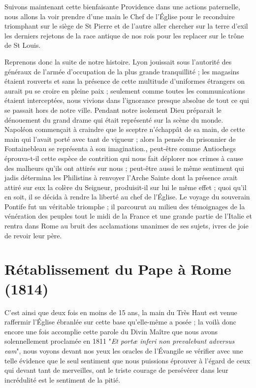 \documentclass[11pt,a4paper]{report}
\begin{document}
Suivons maintenant cette bienfaisante Providence dans une actions paternelle, nous allons la voir prendre d'une main le Chef de l'Église pour le reconduire triomphant sur le siège de St Pierre et de l'autre aller chercher sur la terre d'exil les derniers rejetons de la race antique de nos rois pour les replacer sur le trône de St Louis.

Reprenons donc la suite de notre histoire. Lyon jouissait sous l'autorité des généraux de l'armée d'occupation de la plus grande tranquillité ; les magasins étaient rouverts et sans la présence de cette multitude d'uniformes étrangers on aurait pu se croire en pleine paix ; seulement comme toutes les communications étaient interceptées, nous vivions dans l'ignorance presque absolue de tout ce qui se passait hors de notre ville. Pendant notre isolement Dieu préparait le dénouement du grand drame qui était représenté sur la scène du monde. Napoléon commençait à craindre que le sceptre n'échappât de sa main, de cette main qui l'avait porté avec tant de vigueur ; alors la pensée du prisonnier de Fontainebleau se représenta à son imagination., peut-être comme Antiochegs éprouva-t-il cette espèce de contrition qui nous fait déplorer nos crimes à cause des malheurs qu'ils ont attirés sur nous ; peut-être aussi le même sentiment qui jadis détermina les Philistins à renvoyer l'Arche Sainte dont la présence avait attiré sur eux la colère du Seigneur, produisit-il sur lui le même effet ; quoi qu'il en soit, il se décida à rendre la liberté au chef de l'Église. Le voyage du souverain Pontife fut un véritable triomphe ; il parcourut au milieu des témoignages de la vénération des peuples tout le midi de la France et une grande partie de l'Italie et rentra dans Rome au bruit des acclamations unanimes de ses sujets, ivres de joie de revoir leur père.

\section*{Rétablissement du Pape à Rome (1814)}

C'est ainsi que deux fois en moins de 15 ans, la main du Très Haut est venue raffermir l'Église ébranlée sur cette base qu'elle-même a posée ; la voilà donc encore une fois accomplie cette parole du Divin Maître que nous avons solennellement proclamée en 1811 "\textit{Et portæ inferi non prevalebunt adversus eam}", nous voyons devant nos yeux les oracles de l'Évangile se vérifier avec une telle évidence que le seul sentiment que nous puissions éprouver à l'égard de ceux qui devant tant de merveilles, ont le triste courage de persévérer dans leur incrédulité est le sentiment de la pitié.
\end{document}
